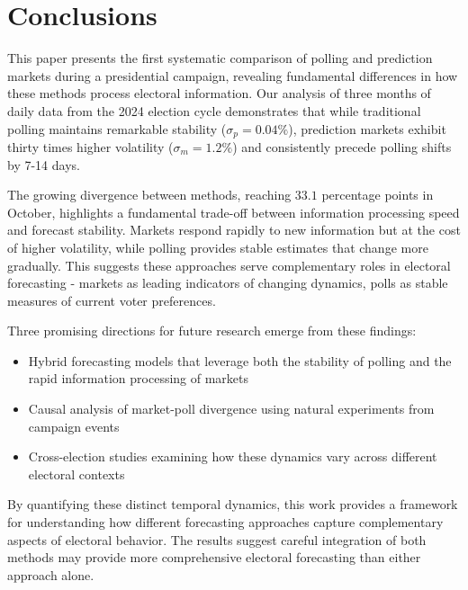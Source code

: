 \documentclass{article} %
\begin{document}
\section{Conclusions}
\label{sec:conclusion}

This paper presents the first systematic comparison of polling and prediction markets during a presidential campaign, revealing fundamental differences in how these methods process electoral information. Our analysis of three months of daily data from the 2024 election cycle demonstrates that while traditional polling maintains remarkable stability ($\sigma_p = 0.04\%$), prediction markets exhibit thirty times higher volatility ($\sigma_m = 1.2\%$) and consistently precede polling shifts by 7-14 days.

The growing divergence between methods, reaching $33.1$ percentage points in October, highlights a fundamental trade-off between information processing speed and forecast stability. Markets respond rapidly to new information but at the cost of higher volatility, while polling provides stable estimates that change more gradually. This suggests these approaches serve complementary roles in electoral forecasting - markets as leading indicators of changing dynamics, polls as stable measures of current voter preferences.

Three promising directions for future research emerge from these findings:
\begin{itemize}
    \item Hybrid forecasting models that leverage both the stability of polling and the rapid information processing of markets
    \item Causal analysis of market-poll divergence using natural experiments from campaign events
    \item Cross-election studies examining how these dynamics vary across different electoral contexts
\end{itemize}

By quantifying these distinct temporal dynamics, this work provides a framework for understanding how different forecasting approaches capture complementary aspects of electoral behavior. The results suggest careful integration of both methods may provide more comprehensive electoral forecasting than either approach alone.



\end{document}
